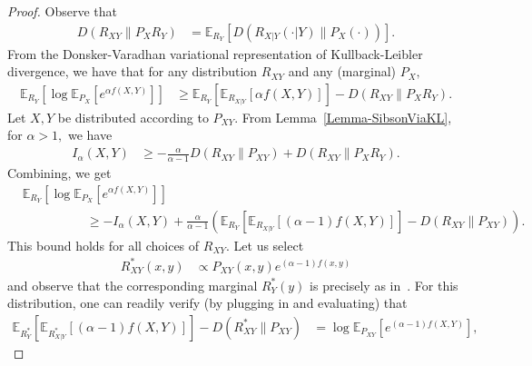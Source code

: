\documentclass{article}
\numberwithin{theorem}{section}
\numberwithin{example}{section}
\numberwithin{remark}{section}
\numberwithin{definition}{section}
\newcommand{\E}{\mathbb{E}}
\begin{document}
\begin{proof}
Observe that
\begin{align}
    D(R_{XY}\|P_XR_Y) &= \E_{R_Y}\left[ D(R_{X|Y}(\cdot|Y)\|P_X(\cdot))  \right].
\end{align}
From the Donsker-Varadhan variational representation of Kullback-Leibler divergence, we have that for any distribution $R_{XY}$ and any (marginal) $P_X,$
\begin{align}
    \E_{R_Y} [\log \E_{P_X}[e^{\alpha f(X,Y)}]] & \ge \E_{R_Y} [\E_{R_{X|Y}}[\alpha f(X,Y)]] - D(R_{XY}\|P_XR_Y).\label{eq:proof-thm-Sibson-var-alternative-eq1}
\end{align}
Let $X,Y$ be distributed according to $P_{XY}.$
From Lemma~\ref{Lemma-SibsonViaKL}, for $\alpha > 1,$ we have
\begin{align}
    I_\alpha(X,Y) & \ge -\frac{\alpha}{\alpha-1} D(R_{XY}\|P_{XY}) + D(R_{XY}\|P_XR_Y).
\end{align}
Combining, we get
\begin{align} &\E_{R_Y} [\log \E_{P_X}[e^{\alpha f(X,Y)}]] \nonumber \\
   &\hspace{5em} \ge - I_\alpha(X,Y) +\frac{\alpha}{\alpha-1} \left( %
     \E_{R_Y} [\E_{R_{X|Y}}[(\alpha-1) f(X,Y)]] - D(R_{XY}\|P_{XY}) 
     \right).
\end{align}
This bound holds for all choices of $R_{XY}.$ Let us select
\begin{align}
R_{XY}^*(x,y) &\propto P_{XY}(x,y) e^{(\alpha-1)f(x,y)}%
\end{align}
and observe that the corresponding marginal $R^*_Y(y)$ is precisely as in~. For this distribution, one can readily verify (by plugging in and evaluating) that
\begin{align}
     \E_{R_Y^*} [\E_{R_{X|Y}^*}[(\alpha-1) f(X,Y)]] - D(R_{XY}^*\|P_{XY}) &= \log \E_{P_{XY}}[e^{(\alpha-1)f(X,Y)}],
\end{align}

\end{proof}
\end{document}
